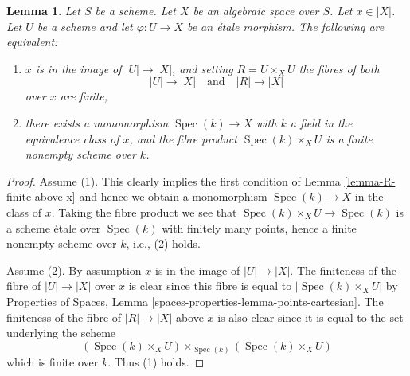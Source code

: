 \documentclass{stacks-project}
\theoremstyle{plain}
\newtheorem{lemma}[subsection]{Lemma}
\theoremstyle{definition}
\theoremstyle{remark}
\numberwithin{equation}{subsection}
\def\Spec{\mathop{\mathrm{Spec}}}
\begin{document}
\begin{lemma}
\label{lemma-weak-UR-finite-above-x}
Let $S$ be a scheme. Let $X$ be an algebraic space over $S$.
Let $x \in |X|$.
Let $U$ be a scheme and let $\varphi : U \to X$ be an \'etale morphism.
The following are equivalent:
\begin{enumerate}
\item $x$ is in the image of $|U| \to |X|$, and
setting $R = U \times_X U$ the fibres of both
$$
|U| \longrightarrow |X|
\quad\text{and}\quad
|R| \longrightarrow |X|
$$
over $x$ are finite,
\item there exists a monomorphism $\Spec(k) \to X$ with $k$ a field
in the equivalence class of $x$, and
the fibre product $\Spec(k) \times_X U$ is
a finite nonempty scheme over $k$.
\end{enumerate}
\end{lemma}

\begin{proof}
Assume (1). This clearly implies the first condition of
Lemma \ref{lemma-R-finite-above-x} and hence we obtain a monomorphism
$\Spec(k) \to X$ in the class of $x$. Taking the fibre product
we see that $\Spec(k) \times_X U \to \Spec(k)$ is a scheme
\'etale over $\Spec(k)$ with finitely many points, hence a finite
nonempty scheme over $k$, i.e., (2) holds.

\medskip\noindent
Assume (2). By assumption $x$ is in the image of
$|U| \to |X|$. The finiteness of the fibre of
$|U| \to |X|$ over $x$ is clear since this fibre is equal to
$|\Spec(k) \times_X U|$ by
Properties of Spaces,
Lemma \ref{spaces-properties-lemma-points-cartesian}.
The finiteness of the fibre of $|R| \to |X|$ above $x$ is also clear
since it is equal to the set underlying the scheme
$$
(\Spec(k) \times_X U) \times_{\Spec(k)} (\Spec(k) \times_X U)
$$
which is finite over $k$. Thus (1) holds.
\end{proof}
\end{document}
